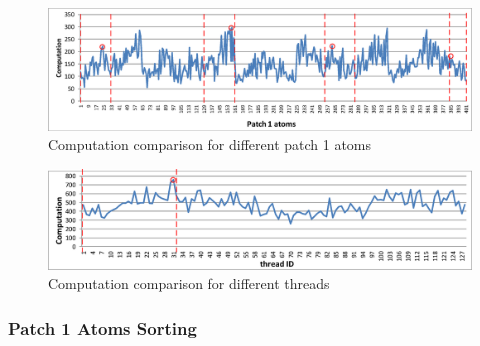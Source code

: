 \begin{figure}[h]
\centering
\setlength{\abovecaptionskip}{-1pt}
\setlength{\belowcaptionskip}{-2pt}
\includegraphics[width=6.0in]{figs/patch1_count.eps}
\caption{Computation comparison for different patch 1 atoms}
\label{figs:patch1-count}
\vspace{-0.5cm}
\end{figure}

\begin{figure}[h]
\centering
\setlength{\abovecaptionskip}{-1pt}
\setlength{\belowcaptionskip}{-2pt}
\includegraphics[width=6.0in]{figs/thread_count.eps}
\caption{Computation comparison for different threads}
\label{figs:thread-count}
\vspace{-0.5cm}
\end{figure}

\subsubsection{Patch 1 Atoms Sorting}
